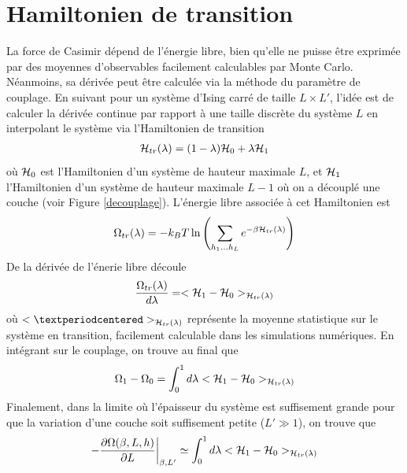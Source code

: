\section{Hamiltonien de transition}
\label{sec-transition}

La force de Casimir dépend  de l'énergie libre, bien qu'elle ne puisse être exprimée par des moyennes d'observables facilement calculables par Monte Carlo. Néanmoins, sa dérivée peut être calculée via la méthode du paramètre de couplage. En suivant \cite{vasilyev_monte_2007,cardozo_finite_2015} pour un système d'Ising carré de taille $L \times L'$, l'idée est de calculer la dérivée continue par rapport à une taille discrète du système $L$ en interpolant le système via l'Hamiltonien de transition
\begin{align}
    \mathcal{H}_{tr}(\lambda) = (1-\lambda) \mathcal{H}_0 + \lambda \mathcal{H}_1
    \label{hamil-trans}
\end{align}
où $\mathcal{H}_0$ est l'Hamiltonien d'un système de hauteur maximale $L$, et $\mathcal{H}_1$ l'Hamiltonien d'un système de hauteur maximale $L-1$ où on a découplé une couche (voir Figure \ref{decouplage}). L'énergie libre associée à cet Hamiltonien est
\begin{align}
    \Omega_{tr}(\lambda) = -k_B T \ln \left( \sum_{h_1 ... h_L} e^{-\beta \mathcal{H}_{tr}(\lambda)} \right)
\end{align}
De la dérivée de l'énerie libre découle
\begin{align}
    \frac{\Omega_{tr}(\lambda)}{d\lambda} = < \mathcal{H}_1 - \mathcal{H}_0>_{\mathcal{H}_{tr}(\lambda)}
\end{align}
où $< · >_{\mH_{tr}(\lambda)}$ représente la moyenne statistique sur le système en transition, facilement calculable dans les simulations numériques. En intégrant sur le couplage, on trouve au final que
\begin{align}
    \Omega_1 - \Omega_0 = \int_0^1 d\lambda  < \mathcal{H}_1 - \mathcal{H}_0>_{\mathcal{H}_{tr}(\lambda)}
\end{align}
Finalement, dans la limite où l'épaisseur du système est suffisement grande pour que la variation d'une couche soit suffisement petite ($L' \gg 1$), on trouve que
\begin{align}
   - \frac{\partial \Omega(\beta,L,h)}{\partial L} \bigg|_{\beta,L'} \simeq  \int_0^1 d\lambda  < \mathcal{H}_1 - \mathcal{H}_0>_{\mathcal{H}_{tr}(\lambda)}
\end{align}

